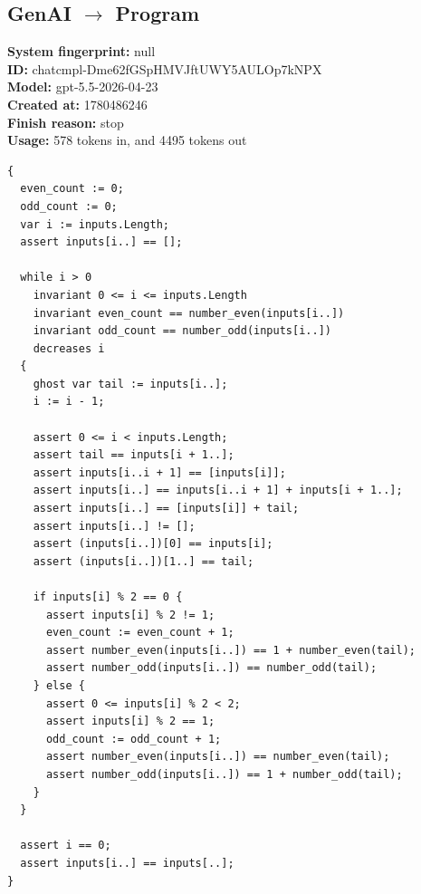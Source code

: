 \documentclass{article}
\begin{document}
\subsection*{GenAI $\rightarrow$ Program}
\textbf{System fingerprint: }null
\\\textbf{ID: }chatcmpl-Dme62fGSpHMVJftUWY5AULOp7kNPX
\\\textbf{Model: }gpt-5.5-2026-04-23
\\\textbf{Created at: }1780486246
\\\textbf{Finish reason: }stop
\\\textbf{Usage: }578 tokens in, and 4495 tokens out
\begin{lstlisting}
{
  even_count := 0;
  odd_count := 0;
  var i := inputs.Length;
  assert inputs[i..] == [];

  while i > 0
    invariant 0 <= i <= inputs.Length
    invariant even_count == number_even(inputs[i..])
    invariant odd_count == number_odd(inputs[i..])
    decreases i
  {
    ghost var tail := inputs[i..];
    i := i - 1;

    assert 0 <= i < inputs.Length;
    assert tail == inputs[i + 1..];
    assert inputs[i..i + 1] == [inputs[i]];
    assert inputs[i..] == inputs[i..i + 1] + inputs[i + 1..];
    assert inputs[i..] == [inputs[i]] + tail;
    assert inputs[i..] != [];
    assert (inputs[i..])[0] == inputs[i];
    assert (inputs[i..])[1..] == tail;

    if inputs[i] % 2 == 0 {
      assert inputs[i] % 2 != 1;
      even_count := even_count + 1;
      assert number_even(inputs[i..]) == 1 + number_even(tail);
      assert number_odd(inputs[i..]) == number_odd(tail);
    } else {
      assert 0 <= inputs[i] % 2 < 2;
      assert inputs[i] % 2 == 1;
      odd_count := odd_count + 1;
      assert number_even(inputs[i..]) == number_even(tail);
      assert number_odd(inputs[i..]) == 1 + number_odd(tail);
    }
  }

  assert i == 0;
  assert inputs[i..] == inputs[..];
}
\end{lstlisting}
\end{document}
